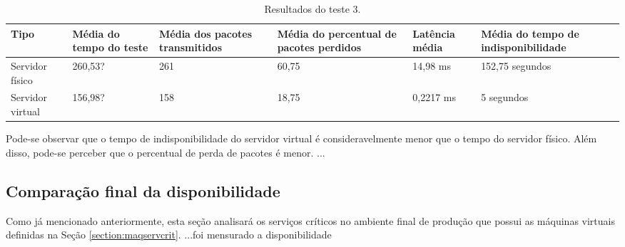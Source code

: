 \begin{table}[h!]
\caption{Resultados do teste 3.}
\label{tab:teste3resultados}
\begin{center}
\begin{tabular}{|l|p{2.5cm}|p{2.5cm}|p{2.5cm}|p{2.5cm}|p{3cm}|}\hline
\textbf{Tipo} & \textbf{Média do tempo do teste} & \textbf{Média dos pacotes transmitidos} & \textbf{Média do percentual de pacotes perdidos} & \textbf{Latência média} & \textbf{Média do tempo de indisponibilidade} \\\hline
Servidor físico & 260,53? & 261 & 60,75 & 14,98 ms & 152,75 segundos \\\hline
Servidor virtual & 156,98? & 158 & 18,75 & 0,2217 ms & 5 segundos \\\hline
\end{tabular}
\end{center}
\end{table}

Pode-se observar que o tempo de indisponibilidade do servidor virtual é consideravelmente menor que o tempo do servidor físico.
Além disso, pode-se perceber que o percentual de perda de pacotes é menor.
...

\subsection{Comparação final da disponibilidade}
\label{section:comparacaofinal}

Como já mencionado anteriormente, esta seção analisará os serviços críticos no ambiente final de produção que possui as máquinas virtuais
definidas na Seção \ref{section:maqservcrit}. 
...foi mensurado a disponibilidade


